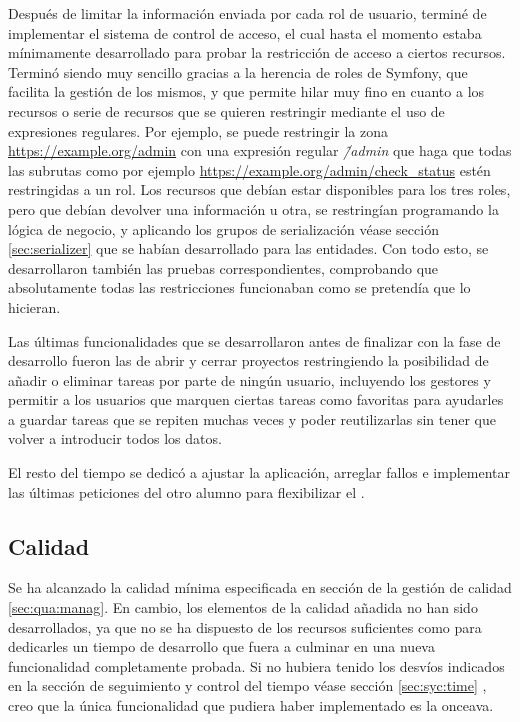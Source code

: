 Después de limitar la información enviada por cada rol de usuario, terminé de implementar el sistema
de control de acceso, el cual hasta el momento estaba mínimamente desarrollado para probar la restricción de
acceso a ciertos recursos. Terminó siendo muy sencillo gracias a la herencia de roles de Symfony,
que facilita la gestión de los mismos, y que permite hilar muy fino en cuanto a los recursos o
serie de recursos que se quieren restringir mediante el uso de expresiones regulares. Por ejemplo, 
se puede restringir la zona \url{https://example.org/admin} con una expresión regular \textit{\^/admin} que haga que todas las
subrutas como por ejemplo \url{https://example.org/admin/check_status} estén restringidas a un rol.
Los recursos que debían estar disponibles para los tres roles, pero que debían devolver una información u otra,
se restringían programando la lógica de negocio, y aplicando los grupos de serialización
\textemdash véase sección \ref{sec:serializer} \textemdash que se habían desarrollado para las
entidades. Con todo esto, se desarrollaron también las pruebas correspondientes, comprobando que
absolutamente todas las restricciones funcionaban como se pretendía que lo hicieran.

Las últimas funcionalidades que se desarrollaron antes de finalizar con la fase de desarrollo
fueron las de abrir y cerrar proyectos \textemdash restringiendo la posibilidad de añadir o
eliminar tareas por parte de ningún usuario, incluyendo los gestores \textemdash y permitir a
los usuarios que marquen ciertas tareas como favoritas \textemdash para ayudarles a guardar tareas que se
repiten muchas veces y poder reutilizarlas sin tener que volver a introducir todos los datos\textemdash.

El resto del tiempo se dedicó a ajustar la aplicación, arreglar fallos e implementar las
últimas peticiones del otro alumno para flexibilizar el .


\subsection{Calidad}
Se ha alcanzado la calidad mínima especificada en sección de la gestión de
calidad \ref{sec:qua:manag}. En cambio, los elementos de la calidad añadida
no han sido desarrollados, ya que no se ha dispuesto de los recursos suficientes
como para dedicarles un tiempo de desarrollo que fuera a culminar en una
nueva funcionalidad completamente probada. Si no hubiera tenido los desvíos indicados en
la sección de seguimiento y control del tiempo \textemdash véase sección 
\ref{sec:syc:time} \textemdash, creo que la única funcionalidad que pudiera
haber implementado es la onceava.

